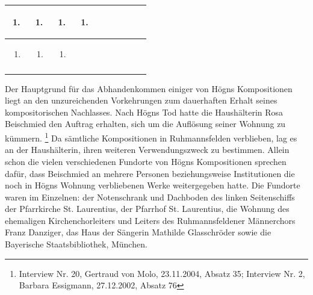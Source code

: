 \begin{center}
\begin{minipage}{8.096cm}
\begin{flushleft}
\begin{supertabular}{|m{0.60800004cm}|m{0.60800004cm}|m{0.60800004cm}|m{0.60800004cm}|m{0.60800004cm}|m{0.60800004cm}|m{0.60800004cm}|m{0.60800004cm}|m{0.60800004cm}|m{0.626cm}|}
\begin{enumerate}
\item
\end{enumerate}
 &
\begin{enumerate}
\item
\end{enumerate}
 &
\begin{enumerate}
\item
\end{enumerate}
 &
\begin{enumerate}
\item
\end{enumerate}
\\\hline
\begin{enumerate}
\item
\end{enumerate}
 &
\begin{enumerate}
\item
\end{enumerate}
 &
\begin{enumerate}
\item
\end{enumerate}
 &
\\\hhline{---~~~~~~~}
\end{supertabular}
\end{flushleft}
\end{minipage}
\end{center}
Der Hauptgrund für das Abhandenkommen einiger von Högns Kompositionen
liegt an den unzureichenden Vorkehrungen zum dauerhaften Erhalt seines
kompositorischen Nachlasses. Nach Högns Tod hatte die Haushälterin Rosa
Beischmied den Auftrag erhalten, sich um die Auflösung seiner Wohnung
zu kümmern. \footnote{Interview Nr. 20, Gertraud von Molo, 23.11.2004,
Absatz 35; Interview Nr. 2, Barbara Essigmann, 27.12.2002, Absatz 76}
Da sämtliche Kompositionen in Ruhmannsfelden verblieben, lag es an der
Haushälterin, ihren weiteren Verwendungszweck zu bestimmen. Allein
schon die vielen verschiedenen Fundorte von Högns Kompositionen
sprechen dafür, dass Beischmied an mehrere Personen beziehungsweise
Institutionen die noch in Högns Wohnung verbliebenen Werke
weitergegeben hatte. Die Fundorte waren im Einzelnen: der Notenschrank
und Dachboden des linken Seitenschiffs der Pfarrkirche St. Laurentius,
der Pfarrhof St. Laurentius, die Wohnung des ehemaligen
Kirchenchorleiters und Leiters des Ruhmannsfeldener Männerchors Franz
Danziger, das Haus der Sängerin Mathilde Glasschröder sowie die
Bayerische Staatsbibliothek, München.

